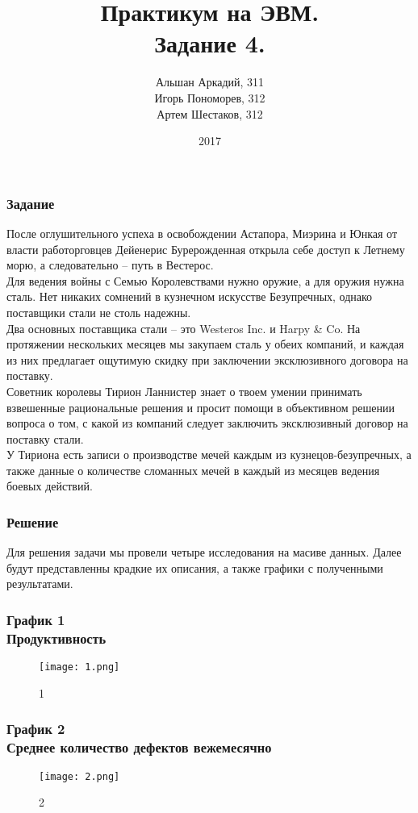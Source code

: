 \documentclass[8pt]{beamer}
\title{Практикум на ЭВМ.\\ Задание 4.}
\author{ Альшан Аркадий, 311\\ Игорь Пономорев, 312\\ Артем Шестаков, 312}
\institute{МГУ имени М.В. Ломоносова}
\date{2017}
\begin{document}
 
\frame{\titlepage}
 
\begin{frame}
\frametitle{Задание}
После оглушительного успеха в освобождении Астапора, Миэрина и Юнкая от власти работорговцев Дейенерис Бурерожденная открыла себе доступ к Летнему морю, а следовательно -- путь в Вестерос.\\
Для ведения войны с Семью Королевствами нужно оружие, а для оружия нужна сталь. Нет никаких сомнений в кузнечном искусстве Безупречных, однако поставщики стали не столь надежны.\\
Два основных поставщика стали -- это {Westeros Inc.} и {Harpy \& Co}. На протяжении нескольких месяцев мы закупаем сталь у обеих компаний, и каждая из них предлагает ощутимую скидку при заключении эксклюзивного договора на поставку.\\
Советник королевы Тирион Ланнистер знает о твоем умении принимать взвешенные рациональные решения и просит помощи в объективном решении вопроса о том, с какой из компаний следует заключить эксклюзивный договор на поставку стали.\\
У Тириона есть записи о производстве мечей каждым из кузнецов-безупречных, а также данные о количестве сломанных мечей в каждый из месяцев ведения боевых действий.\\
\end{frame}

\begin{frame}
\frametitle{Решение}
Для решения задачи мы провели четыре исследования на масиве данных. Далее будут представленны крадкие их описания, а также графики с полученными результатами.
\end{frame}
 

\begin{frame}
\frametitle{График 1\\{ Продуктивность}}
\begin{figure}[h]
		\texttt{[image: 1.png]}
		\caption{1}
		\label{First}
\end{figure}
\end{frame}

\begin{frame}
\frametitle{График 2 \\{\small Среднее количество дефектов вежемесячно}}
\begin{figure}[h]
		\texttt{[image: 2.png]}
		\caption{2}
		\label{Second}
\end{figure}

\end{frame}
\end{document}
